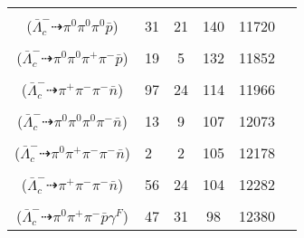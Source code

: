 \documentclass[landscape]{article}
\newcounter{rownumbers}
\newcommand\rn{\stepcounter{rownumbers}\arabic{rownumbers}}
\newcommand{\EOL}{\\} %
\newcommand{\topoTags}[1]{#1} %
\begin{document}
\begin{longtable}{clcccc}
\rn & \makecell[l]{ $ 
\bar{\Lambda}_{c}^{-} \rightarrow \pi^{0} K^{0} \bar{p} ,
K^{0} \rightarrow K_{S}^{0} ,
K_{S}^{0} \rightarrow \pi^{0} \pi^{0} 
$ \\ ($
\bar{\Lambda}_{c}^{-} \dashrightarrow \pi^{0} \pi^{0} \pi^{0} \bar{p} 
$) } & \topoTags{31 & 21 & }140 & 11720 \EOL

\rn & \makecell[l]{ $ 
\bar{\Lambda}_{c}^{-} \rightarrow \rho^{-} \bar{\Sigma}^{*0} ,
\rho^{-} \rightarrow \pi^{0} \pi^{-} ,
\bar{\Sigma}^{*0} \rightarrow \pi^{0} \bar{\Lambda} ,
\bar{\Lambda} \rightarrow \pi^{+} \bar{p} 
$ \\ ($
\bar{\Lambda}_{c}^{-} \dashrightarrow \pi^{0} \pi^{0} \pi^{+} \pi^{-} \bar{p} 
$) } & \topoTags{19 & 5 & }132 & 11852 \EOL

\rn & \makecell[l]{ $ 
\bar{\Lambda}_{c}^{-} \rightarrow \pi^{-} \pi^{-} \bar{\Sigma}^{+} ,
\bar{\Sigma}^{+} \rightarrow \pi^{+} \bar{n} 
$ \\ ($
\bar{\Lambda}_{c}^{-} \dashrightarrow \pi^{+} \pi^{-} \pi^{-} \bar{n} 
$) } & \topoTags{97 & 24 & }114 & 11966 \EOL

\rn & \makecell[l]{ $ 
\bar{\Lambda}_{c}^{-} \rightarrow \pi^{0} \pi^{0} \pi^{-} \bar{\Lambda} ,
\bar{\Lambda} \rightarrow \pi^{0} \bar{n} 
$ \\ ($
\bar{\Lambda}_{c}^{-} \dashrightarrow \pi^{0} \pi^{0} \pi^{0} \pi^{-} \bar{n} 
$) } & \topoTags{13 & 9 & }107 & 12073 \EOL

\rn & \makecell[l]{ $ 
\bar{\Lambda}_{c}^{-} \rightarrow \omega \bar{\Sigma}^{-} ,
\omega \rightarrow \pi^{0} \pi^{+} \pi^{-} ,
\bar{\Sigma}^{-} \rightarrow \pi^{-} \bar{n} 
$ \\ ($
\bar{\Lambda}_{c}^{-} \dashrightarrow \pi^{0} \pi^{+} \pi^{-} \pi^{-} \bar{n} 
$) } & \topoTags{2 & 2 & }105 & 12178 \EOL

\rn & \makecell[l]{ $ 
\bar{\Lambda}_{c}^{-} \rightarrow \pi^{+} \pi^{-} \bar{\Sigma}^{-} ,
\bar{\Sigma}^{-} \rightarrow \pi^{-} \bar{n} 
$ \\ ($
\bar{\Lambda}_{c}^{-} \dashrightarrow \pi^{+} \pi^{-} \pi^{-} \bar{n} 
$) } & \topoTags{56 & 24 & }104 & 12282 \EOL

\rn & \makecell[l]{ $ 
\bar{\Lambda}_{c}^{-} \rightarrow \eta^{\prime} \bar{\Sigma}^{-} ,
\eta^{\prime} \rightarrow \pi^{+} \pi^{-} \gamma^{F} ,
\bar{\Sigma}^{-} \rightarrow \pi^{0} \bar{p} 
$ \\ ($
\bar{\Lambda}_{c}^{-} \dashrightarrow \pi^{0} \pi^{+} \pi^{-} \bar{p} \gamma^{F} 
$) } & \topoTags{47 & 31 & }98 & 12380 \EOL


\end{longtable}
\end{document}
